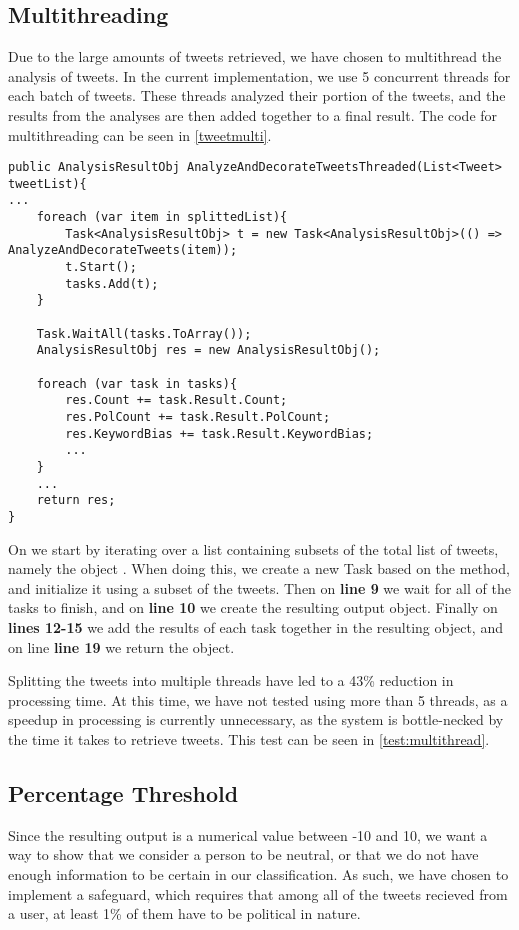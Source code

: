 \subsection{Multithreading}
Due to the large amounts of tweets retrieved, we have chosen to multithread the
analysis of tweets. In the current implementation, we use 5 concurrent threads
for each batch of tweets. These threads analyzed their portion of the tweets,
and the results from the analyses are then added together to a final result. The
code for multithreading can be seen in \autoref{tweetmulti}.\nl

\begin{minipage}[H]{\linewidth}
\begin{lstlisting}[caption = Multithreading of the tweet analysis, label = tweetmulti] 
public AnalysisResultObj AnalyzeAndDecorateTweetsThreaded(List<Tweet> tweetList){ 
...
	foreach (var item in splittedList){
    	Task<AnalysisResultObj> t = new Task<AnalysisResultObj>(() => AnalyzeAndDecorateTweets(item)); 
    	t.Start();
        tasks.Add(t);
    }

	Task.WaitAll(tasks.ToArray());
    AnalysisResultObj res = new AnalysisResultObj();
 
    foreach (var task in tasks){
    	res.Count += task.Result.Count;
        res.PolCount += task.Result.PolCount;
        res.KeywordBias += task.Result.KeywordBias;
		...
    }
    ...
    return res;
}
\end{lstlisting}
\end{minipage}

On  we start by iterating over a list containing subsets of the
total list of tweets, namely the  object . When doing this, we
create a new Task based on the  method, and
initialize it using a subset of the tweets. Then on \textbf{line 9} we wait for
all of the tasks to finish, and on \textbf{line 10} we create the resulting
output object. Finally on \textbf{lines 12-15} we add the results of each task
together in the resulting object, and on line \textbf{line 19} we return the
object.\nl

Splitting the tweets into multiple threads have led
to a 43\% reduction in processing time. At this time, we have not tested using more
than 5 threads, as a speedup in processing is currently unnecessary, as the
system is bottle-necked by the time it takes to retrieve tweets. This test can
be seen in \autoref{test:multithread}.\nl

\subsection{Percentage Threshold}
Since the resulting output is a numerical value between -10 and 10, we want a
way to show that we consider a person to be neutral, or that we do not have
enough information to be certain in our classification. As such, we have chosen
to implement a safeguard, which requires that among all of the tweets recieved
from a user, at least 1\% of them have to be political in nature. 